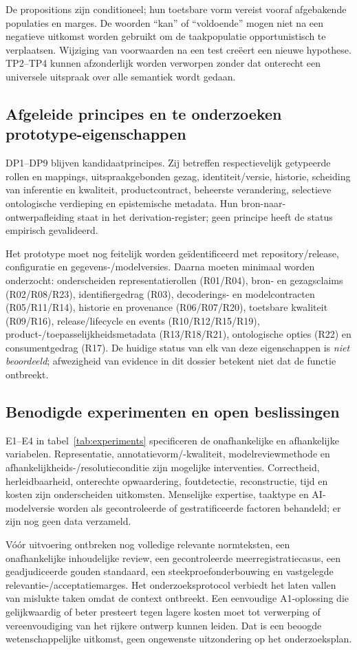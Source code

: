 De propositions zijn conditioneel; hun toetsbare vorm vereist vooraf afgebakende populaties en marges. De woorden ``kan'' of ``voldoende'' mogen niet na een negatieve uitkomst worden gebruikt om de taakpopulatie opportunistisch te verplaatsen. Wijziging van voorwaarden na een test creëert een nieuwe hypothese. TP2--TP4 kunnen afzonderlijk worden verworpen zonder dat onterecht een universele uitspraak over alle semantiek wordt gedaan.

\subsection{Afgeleide principes en te onderzoeken prototype-eigenschappen}
DP1--DP9 blijven kandidaatprincipes. Zij betreffen respectievelijk getypeerde rollen en mappings, uitspraakgebonden gezag, identiteit/versie, historie, scheiding van inferentie en kwaliteit, productcontract, beheerste verandering, selectieve ontologische verdieping en epistemische metadata. Hun bron-naar-ontwerpafleiding staat in het derivation-register; geen principe heeft de status empirisch gevalideerd.

Het prototype moet nog feitelijk worden geïdentificeerd met repository/release, configuratie en gegevens-/modelversies. Daarna moeten minimaal worden onderzocht: onderscheiden representatierollen (R01/R04), bron- en gezagsclaims (R02/R08/R23), identifiergedrag (R03), decoderings- en modelcontracten (R05/R11/R14), historie en provenance (R06/R07/R20), toetsbare kwaliteit (R09/R16), release/lifecycle en events (R10/R12/R15/R19), product-/toepasselijkheidsmetadata (R13/R18/R21), ontologische opties (R22) en consumentgedrag (R17). De huidige status van elk van deze eigenschappen is \emph{niet beoordeeld}; afwezigheid van evidence in dit dossier betekent niet dat de functie ontbreekt.

\subsection{Benodigde experimenten en open beslissingen}
E1--E4 in tabel~\ref{tab:experiments} specificeren de onafhankelijke en afhankelijke variabelen. Representatie, annotatievorm/-kwaliteit, modelreviewmethode en afhankelijkheids-/resolutieconditie zijn mogelijke interventies. Correctheid, herleidbaarheid, onterechte opwaardering, foutdetectie, reconstructie, tijd en kosten zijn onderscheiden uitkomsten. Menselijke expertise, taaktype en AI-modelversie worden als gecontroleerde of gestratificeerde factoren behandeld; er zijn nog geen data verzameld.

Vóór uitvoering ontbreken nog volledige relevante normteksten, een onafhankelijke inhoudelijke review, een gecontroleerde meerregistratiecasus, een geadjudiceerde gouden standaard, een steekproefonderbouwing en vastgelegde relevantie-/acceptatiemarges. Het onderzoeksprotocol verbiedt het laten vallen van mislukte taken omdat de context ontbreekt. Een eenvoudige A1-oplossing die gelijkwaardig of beter presteert tegen lagere kosten moet tot verwerping of vereenvoudiging van het rijkere ontwerp kunnen leiden. Dat is een beoogde wetenschappelijke uitkomst, geen ongewenste uitzondering op het onderzoeksplan.
